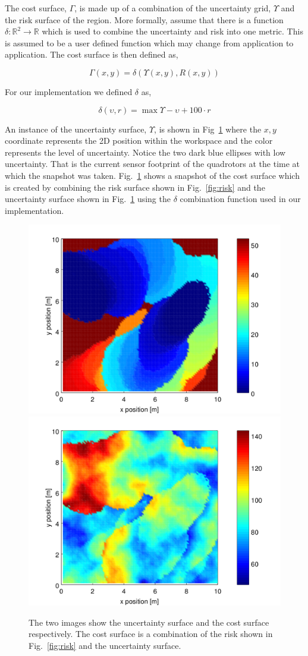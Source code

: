 \documentclass{article}
\begin{document}
The cost surface, $\Gamma$, is made up of a combination of the uncertainty
grid, $\Upsilon$ and the risk surface of the region. More formally, assume that
there is a function $\delta : \mathbb{R}^2 \rightarrow \mathbb{R}$ which is
used to combine the uncertainty and risk into one metric. This is assumed to be
a user defined function which may change from application to application. The
cost surface is then defined as,

$$\Gamma(x, y) = \delta(\Upsilon(x, y), R(x, y))$$

For our implementation we defined $\delta$ as,

$$\delta(\upsilon, r) = \max{\Upsilon} - \upsilon + 100 \cdot r$$

An instance of the uncertainty surface, $\Upsilon$, is shown in
Fig~\ref{fig:cost} where the $x, y$ coordinate represents the 2D position within
the workspace and the color represents the level of uncertainty. Notice the two
dark blue ellipses with low uncertainty. That is the current sensor footprint
of the quadrotors at the time at which the snapshot was taken.
Fig.~\ref{fig:cost} shows a snapshot of the cost surface which is created by
combining the risk surface shown in Fig.~\ref{fig:risk} and the uncertainty
surface shown in Fig.~\ref{fig:cost} using the $\delta$ combination function
used in our implementation.

\begin{figure}[h!]

    \includegraphics[width=0.49\columnwidth]{tasefigs/grid3.png}
    \includegraphics[width=0.49\columnwidth]{tasefigs/cost3.png}

    \caption{The two images show the uncertainty surface and the cost surface
    respectively. The cost surface is a combination of the risk shown in
    Fig.~\ref{fig:risk} and the uncertainty surface.}

    \label{fig:cost}

\end{figure}
\end{document}
